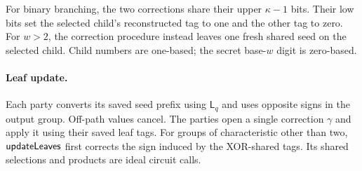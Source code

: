 For binary branching, the two corrections share their upper $\kappa-1$
bits. Their low bits set the selected child's reconstructed tag to one and
the other tag to zero. For $w>2$, the correction procedure instead leaves
one fresh shared seed on the selected child. Child numbers are one-based;
the secret base-$w$ digit is zero-based.

\paragraph{Leaf update.}
Each party converts its saved seed prefix using $\mathsf L_q$ and uses
opposite signs in the output group. Off-path values cancel.
The parties open a single correction $\gamma$ and apply it using their
saved leaf tags. For groups of characteristic other than two,
$\textsf{updateLeaves}$ first corrects the sign induced by the XOR-shared tags.
Its shared selections and products are ideal circuit calls.

